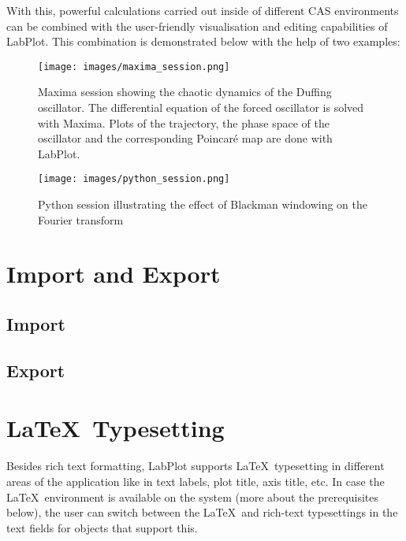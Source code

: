 With this, powerful calculations carried out inside of different CAS environments can be combined with the user-friendly visualisation and editing capabilities of LabPlot. This combination is demonstrated below with the help of two examples:
\begin{figure}
\texttt{[image: images/maxima\_session.png]}
\caption{Maxima session showing the chaotic dynamics of the Duffing oscillator. The differential equation of the forced oscillator is solved with Maxima. Plots of the trajectory, the phase space of the oscillator and the corresponding Poincaré map are done with LabPlot.}
\end{figure}

\begin{figure}
\texttt{[image: images/python\_session.png]}
\caption{Python session illustrating the effect of Blackman windowing on the Fourier transform}
\end{figure}



\chapter{Import and Export}\label{ch:import_export}
\section{Import}\label{sec:import}
\section{Export}\label{sec:export}

\chapter{\LaTeX\, Typesetting}\label{ch:latex_typesetting}
Besides rich text formatting, LabPlot supports \LaTeX\, typesetting in different areas of the application like in text labels, plot title, axis title, etc. In case the \LaTeX\, environment is available on the system (more about the prerequisites below), the user can switch between the \LaTeX\, and rich-text typesettings in the text fields for objects that support this.

